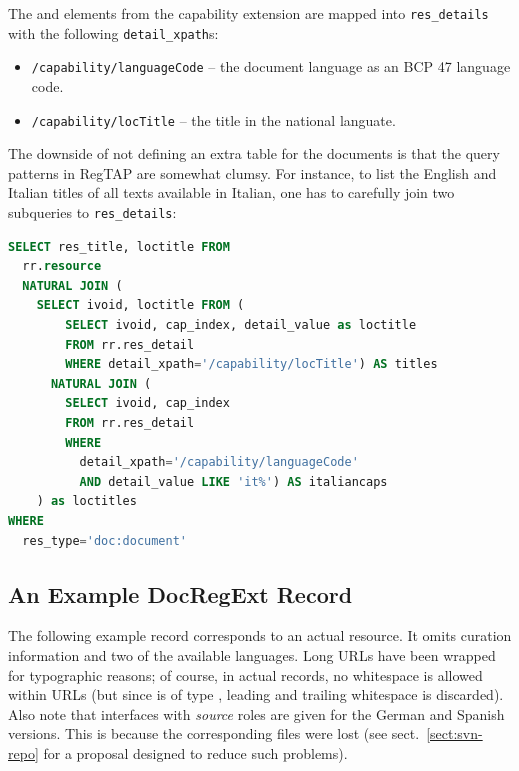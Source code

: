 \documentclass{ivoa}
\begin{document}
The  and  elements from the
 capability extension are mapped into
\verb|res_details| with the following \verb|detail_xpath|s:

\begin{itemize}

\item \texttt{/capability/languageCode} -- the document language as an 
BCP 47 \citep{std:BCP47} language code.
\item \texttt{/capability/locTitle} -- the title in the national
languate.
\end{itemize}

The downside of not defining an extra table for the documents is that
the query patterns in RegTAP are somewhat clumsy.  For instance, to list
the English and Italian titles of all texts available in Italian, one
has to carefully join two subqueries to \verb|res_details|:

\begin{lstlisting}[language=SQL]
SELECT res_title, loctitle FROM
  rr.resource 
  NATURAL JOIN (
    SELECT ivoid, loctitle FROM (
        SELECT ivoid, cap_index, detail_value as loctitle
        FROM rr.res_detail
        WHERE detail_xpath='/capability/locTitle') AS titles
      NATURAL JOIN (
        SELECT ivoid, cap_index 
        FROM rr.res_detail
        WHERE 
          detail_xpath='/capability/languageCode'
          AND detail_value LIKE 'it%') AS italiancaps
    ) as loctitles
WHERE
  res_type='doc:document'
\end{lstlisting}

\subsection{An Example DocRegExt Record}

The following example record corresponds to an actual resource.  It
omits curation information and two of the available languages.  Long
URLs have been wrapped for typographic reasons; of course, in actual
records, no whitespace is allowed within URLs (but since
 is of type , leading and trailing
whitespace is discarded).  Also note that interfaces with
\textit{source} roles
are given for the German and Spanish versions.  This is because the
corresponding files were lost (see sect.~\ref{sect:svn-repo} for a
proposal designed to reduce such problems).


\end{document}
